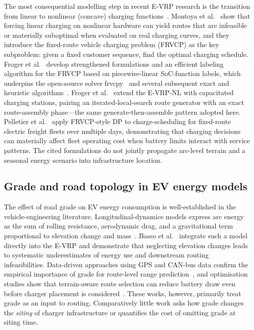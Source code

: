 \documentclass[review,3p,authoryear]{elsarticle}
\begin{document}
The most consequential modelling step in recent E-VRP research is the
transition from linear to nonlinear (concave) charging
functions~\citep{Montoya2017}.  Montoya et al.~\citep{Montoya2017} show that forcing
linear charging on nonlinear hardware can yield routes that are infeasible
or materially suboptimal when evaluated on real charging curves, and
they introduce the fixed-route vehicle charging problem (FRVCP) as the
key subproblem: given a fixed customer sequence, find the optimal charging
schedule.  Froger et al.~\citep{Froger2019} develop strengthened formulations and an
efficient labeling algorithm for the FRVCP based on piecewise-linear
SoC-function labels, which underpins the open-source solver
frvcpy~\citep{Kullman2021joc} and several subsequent exact and heuristic
algorithms~\citep{Lee2021,Kullman2021ts}.  Froger et al.~\citep{Froger2021cap}
extend the E-VRP-NL with capacitated charging stations, pairing an
iterated-local-search route generator with an exact route-assembly
phase---the same generate-then-assemble pattern adopted here.  Pelletier et al.~\citep{Pelletier2018} apply
FRVCP-style DP to charge-scheduling for fixed-route electric freight fleets
over multiple days, demonstrating that charging decisions can materially affect
fleet operating cost when battery limits interact with service patterns.
The cited formulations do not jointly propagate arc-level terrain and a
seasonal energy scenario into infrastructure location.

\subsection{Grade and road topology in EV energy models}

The effect of road grade on EV energy consumption is well-established in
the vehicle-engineering literature.  Longitudinal-dynamics models express
arc energy as the sum of rolling resistance, aerodynamic drag, and a
gravitational term proportional to elevation change and
mass~\citep{Fiori2016}.  Basso et al.~\citep{Basso2019} integrate such a model
directly into the E-VRP and demonstrate that neglecting elevation changes
leads to systematic underestimates of energy use and downstream routing
infeasibilities.  Data-driven approaches using GPS and CAN-bus data
confirm the empirical importance of grade for route-level range
prediction~\citep{DeCauwer2017}, and optimisation studies show that
terrain-aware route selection can reduce battery draw even
before charger placement is considered~\citep{Perger2020}.  These works,
however, primarily treat grade as an input to routing.  Comparatively little
work asks how grade changes the \emph{siting} of charger infrastructure or
quantifies the cost of omitting grade at siting time.
\end{document}
